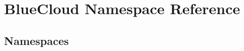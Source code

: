\hypertarget{namespace_blue_cloud}{}\section{Blue\+Cloud Namespace Reference}
\label{namespace_blue_cloud}
\subsection*{Namespaces}
\begin{DoxyCompactItemize}
\end{DoxyCompactItemize}
